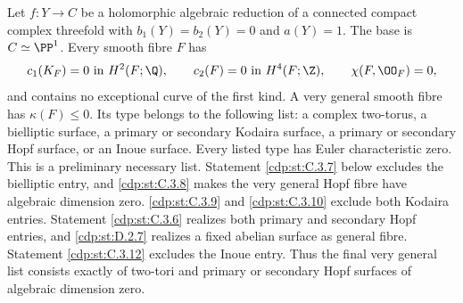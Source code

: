 
\begin{proposition}\label{cdp:st:C.3.1}
Let $f:Y\to C$ be a holomorphic algebraic reduction of a connected
compact complex threefold with $b_1(Y)=b_2(Y)=0$ and $a(Y)=1$.
The base is $C\simeq\PP^1$. Every smooth fibre $F$ has
\[
 c_1(K_F)=0\text{ in }H^2(F;\Q),\qquad
 c_2(F)=0\text{ in }H^4(F;\Z),\qquad
 \chi(F,\OO_F)=0,
\]
and contains no exceptional curve of the first kind. A very general
smooth fibre has $\kappa(F)\leq0$. Its type belongs to the following
list: a complex two-torus, a bielliptic surface, a primary or secondary
Kodaira surface, a primary or secondary Hopf surface, or an Inoue
surface. Every listed type has Euler characteristic zero. This is a
preliminary necessary list. Statement \ref{cdp:st:C.3.7} below excludes the
bielliptic entry, and \ref{cdp:st:C.3.8} makes the very general Hopf fibre have
algebraic dimension zero. \ref{cdp:st:C.3.9} and \ref{cdp:st:C.3.10} exclude both Kodaira
entries. Statement \ref{cdp:st:C.3.6} realizes both primary and secondary Hopf
entries, and \ref{cdp:st:D.2.7} realizes a fixed abelian surface as general
fibre. Statement \ref{cdp:st:C.3.12} excludes the Inoue entry. Thus the
final very general list consists exactly of two-tori and
primary or secondary Hopf surfaces of algebraic dimension zero.
\end{proposition}
